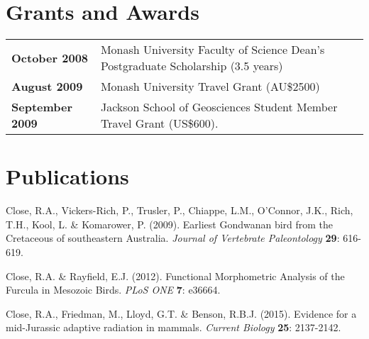\documentclass[a4paper, oneside, final]{scrartcl} %
\begin{document}
\begin{center}

\section{Grants and Awards}
\begin{tabular}{ @{} >{\bfseries}l @{\hspace{6ex}} l }
October 2008 & Monash University Faculty of Science Dean's Postgraduate Scholarship (3.5 years) \\
August 2009 & Monash University Travel Grant (AU\$2500) \\
September 2009 & Jackson School of Geosciences Student Member Travel Grant (US\$600).
\end{tabular}



\section{Publications}
\begin{flushleft}
Close, R.A., Vickers-Rich, P., Trusler, P., Chiappe, L.M., O'Connor, J.K., Rich, T.H., Kool, L. \& Komarower, P. (2009). Earliest Gondwanan bird from the Cretaceous of southeastern Australia. \emph{Journal of Vertebrate Paleontology} \textbf{29}: 616-619. 

\vspace{6pt}

Close, R.A. \& Rayfield, E.J. (2012). Functional Morphometric Analysis of the Furcula in Mesozoic Birds. \emph{PLoS ONE} \textbf{7}: e36664. 

\vspace{6pt}

Close, R.A., Friedman, M., Lloyd, G.T. \& Benson, R.B.J. (2015). Evidence for a mid-Jurassic adaptive radiation in mammals. \emph{Current Biology} \textbf{25}: 2137-2142. 


\end{flushleft}
\end{center}
\end{document}
